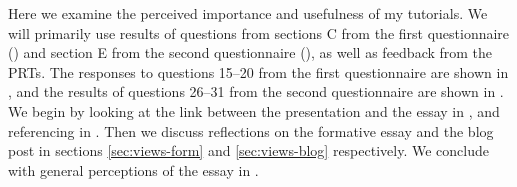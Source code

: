 Here we examine the perceived importance and usefulness of my tutorials. We will primarily use results of questions from sections C from the first questionnaire () and section E from the second questionnaire (), as well as feedback from the PRTs. The responses to questions 15--20 from the first questionnaire are shown in , and the results of questions 26--31 from the second questionnaire are shown in . We begin by looking at the link between the presentation and the essay in , and referencing in . Then we discuss reflections on the formative essay and the blog post in sections \ref{sec:views-form} and \ref{sec:views-blog} respectively. We conclude with general perceptions of the essay in .
\begin{figure}
  \centering
    \quad
    \\ 
    \quad

\end{figure}
